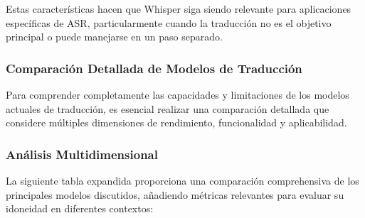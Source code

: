 Estas características hacen que Whisper siga siendo relevante para aplicaciones específicas de ASR, particularmente cuando la traducción no es el objetivo principal o puede manejarse en un paso separado.

\subsubsection{Comparación Detallada de Modelos de Traducción}
Para comprender completamente las capacidades y limitaciones de los modelos actuales de traducción, es esencial realizar una comparación detallada que considere múltiples dimensiones de rendimiento, funcionalidad y aplicabilidad.

\subsubsection{Análisis Multidimensional}
La siguiente tabla expandida proporciona una comparación comprehensiva de los principales modelos discutidos, añadiendo métricas relevantes para evaluar su idoneidad en diferentes contextos:

